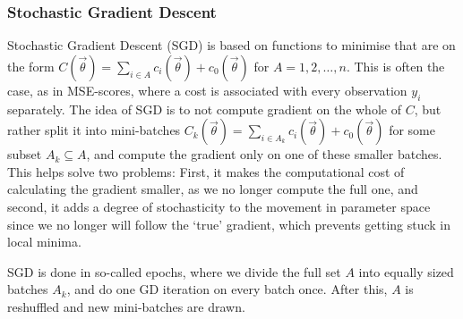     \subsubsection{Stochastic Gradient Descent} 
        Stochastic Gradient Descent (SGD) is based on functions to minimise that are on the form $C(\vec{\theta}) = \sum_{i \in A} c_i(\vec{\theta}) + c_0(\vec{\theta})$ for $A=1,2,\ldots,n$. This is often the case, as in MSE-scores, where a cost is associated with every observation $y_i$ separately. The idea of SGD is to not compute gradient on the whole of $C$, but rather split it into mini-batches $C_k(\vec{\theta}) = \sum_{i\in A_k} c_i(\vec{\theta}) + c_0(\vec{\theta})$ for some subset $A_k \subseteq A$, and compute the gradient only on one of these smaller batches. This helps solve two problems: First, it makes the computational cost of calculating the gradient smaller, as we no longer compute the full one, and second, it adds a degree of stochasticity to the movement in parameter space since we no longer will follow the `true' gradient, which prevents getting stuck in local minima.

        SGD is done in so-called epochs, where we divide the full set $A$ into equally sized batches $A_k$, and do one GD iteration on every batch once. After this, $A$ is reshuffled and new mini-batches are drawn.